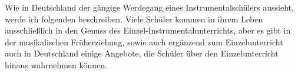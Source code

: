
Wie in Deutschland der gängige Werdegang eines Instrumentalschülers aussieht, werde
ich folgenden beschreiben. Viele Schüler kommen in ihrem Leben ausschließlich in
den Genuss des Einzel-Instrumentalunterrichts, aber es gibt in der musikalischen
Früherziehung, sowie auch ergänzend zum Einzelunterricht auch in Deutschland
einige Angebote, die Schüler über den Einzelunterricht hinaus wahrnehmen können.





